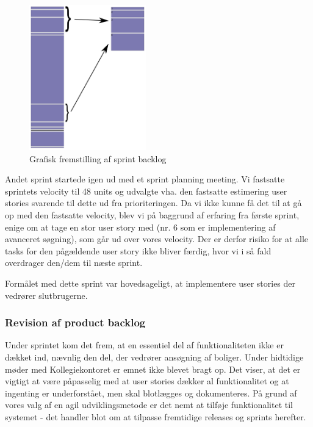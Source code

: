 \documentclass[12pt, a4paper]{report}
\begin{document}
\begin{figure}
\begin{center}
\includegraphics[width=0.45\textwidth]{sprint2log}
\end{center}
\caption{Grafisk fremstilling af sprint backlog}
\label{sprintlog2}
\end{figure}

Andet sprint startede igen ud med et sprint planning meeting. Vi fastsatte sprintets velocity til 48 units og udvalgte vha. den fastsatte estimering user stories svarende til dette ud fra prioriteringen. Da vi ikke kunne få det til at gå op med den fastsatte velocity, blev vi på baggrund af erfaring fra første sprint, enige om at tage en stor user story med (nr. 6 som er implementering af avanceret søgning), som går ud over vores velocity. Der er derfor risiko for at alle tasks for den pågældende user story ikke bliver færdig, hvor vi i så fald overdrager den/dem til næste sprint.

Formålet med dette sprint var hovedsageligt, at implementere user stories der vedrører slutbrugerne.


\subsubsection{Revision af product backlog}

Under sprintet kom det frem, at en essentiel del af funktionaliteten ikke er dækket ind, nævnlig den del, der vedrører ansøgning af boliger. Under hidtidige møder med Kollegiekontoret er emnet ikke blevet bragt op. Det viser, at det er vigtigt at være påpasselig med at user stories dækker al funktionalitet og at ingenting er underforstået, men skal blotlægges og dokumenteres. På grund af vores valg af en agil udviklingsmetode er det nemt at tilføje funktionalitet til systemet - det handler blot om at tilpasse fremtidige releases og sprints herefter.
\end{document}
